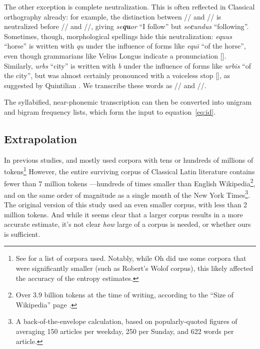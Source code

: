 \documentclass[12pt,twoside]{article}
\newcommand{\ipa}[1]{/\textipa{#1}/}
\newcommand{\ipab}[1]{[\textipa{#1}]}
\begin{document}
The other exception is complete neutralization. This is often reflected in Classical orthography already: for example, the distinction between \ipa{k} and \ipa{k\super{w}} is neutralized before \ipa{u} and \ipa{u:}, giving \emph{se\textbf{qu}or} ``I follow'' but \emph{se\textbf{c}undus} ``following''. Sometimes, though, morphological spellings hide this neutralization: \emph{equus} ``horse'' is written with \emph{qu} under the influence of forms like \emph{equ\=\i} ``of the horse'', even though grammarians like Velius Longus \citep[59.2-8]{longus} indicate a pronunciation \ipab{ekus}. Similarly, \emph{urbs} ``city'' is written with \emph{b} under the influence of forms like \emph{urbis} ``of the city'', but was almost certainly pronounced with a voiceless stop \ipab{urps}, as suggested by Quintilian \citep[I.7.7]{quintilian}. We transcribe these words as \ipa{ekus} and \ipa{urps}.

The syllabified, near-phonemic transcription can then be converted into unigram and bigram frequency lists, which form the input to equation~\ref{eq:id}.

\subsection{Extrapolation}

In previous studies, \citet{coupé} and \citet{oh} mostly used corpora with tens or hundreds of millions of tokens\footnote{See \cite[30-31]{oh} for a list of corpora used. Notably, while Oh did use some corpora that were significantly smaller (such as Robert's Wolof corpus), this likely affected the accuracy of the entropy estimates.} However, the entire surviving corpus of Classical Latin literature contains fewer than 7 million tokens \citep{phi}---hundreds of times smaller than English Wikipedia\footnote{Over 3.9 billion tokens at the time of writing, according to the ``Size of Wikipedia'' page \citep{wiki}.}, and on the same order of magnitude as a single month of the New York Times\footnote{A back-of-the-envelope calculation, based on popularly-quoted figures of averaging 150 articles per weekday, 250 per Sunday, and 622 words per article.}. The original version of this study used an even smaller corpus, with less than 2 million tokens. And while it seems clear that a larger corpus results in a more accurate estimate, it's not clear \emph{how} large of a corpus is needed, or whether ours is sufficient.
\end{document}

